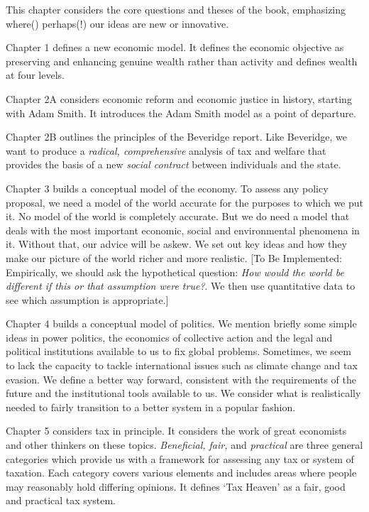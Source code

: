 \documentclass[]{tufte-handout}
\begin{document}
This chapter considers the core questions and theses of the book,
emphasizing where() perhaps(!) our ideas are new or innovative.

Chapter 1 defines a new economic model. It defines the economic
objective as preserving and enhancing genuine wealth rather than
activity and defines wealth at four levels.

Chapter 2A considers economic reform and economic justice in history,
starting with Adam Smith. It introduces the Adam Smith model as a point
of departure.

Chapter 2B outlines the principles of the Beveridge report. Like
Beveridge, we want to produce a \emph{radical, comprehensive} analysis
of tax and welfare that provides the basis of a new \emph{social
contract} between individuals and the state.

Chapter 3 builds a conceptual model of the economy. To assess any policy
proposal, we need a model of the world accurate for the purposes to
which we put it. No model of the world is completely accurate. But we do
need a model that deals with the most important economic, social and
environmental phenomena in it. Without that, our advice will be askew.
We set out key ideas and how they make our picture of the world richer
and more realistic. {[}To Be Implemented: Empirically, we should ask the
hypothetical question: \emph{How would the world be different if this or
that assumption were true?}. We then use quantitative data to see which
assumption is appropriate.{]}

Chapter 4 builds a conceptual model of politics. We mention briefly some
simple ideas in power politics, the economics of collective action and
the legal and political institutions available to us to fix global
problems. Sometimes, we seem to lack the capacity to tackle
international issues such as climate change and tax evasion. We define a
better way forward, consistent with the requirements of the future and
the institutional tools available to us. We consider what is
realistically needed to fairly transition to a better system in a
popular fashion.

Chapter 5 considers tax in principle. It considers the work of great
economists and other thinkers on these topics. \emph{Beneficial, fair,}
and \emph{practical} are three general categories which provide us with
a framework for assessing any tax or system of taxation. Each category
covers various elements and includes areas where people may reasonably
hold differing opinions. It defines `Tax Heaven' as a fair, good and
practical tax system.
\end{document}
